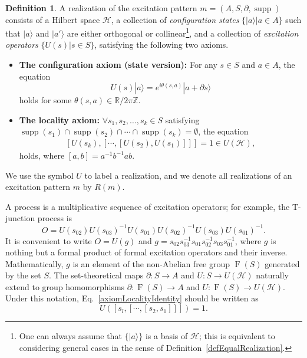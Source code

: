 \documentclass[reprint, amsmath, amssymb, showpacs, floatfix, longbibliography, aps, twocolumn, superscriptaddress, nofootinbib]{revtex4-2}
\newcommand{\ZZ}{{\mathbb Z}}
\newcommand{\RR}{{\mathbb R}}
\newcommand{\supp}{\operatorname{supp}}
\theoremstyle{definition}
\newtheorem{definition}{Definition}[section]
\begin{document}
\begin{definition}\label{defRealization}
	A realization of the excitation pattern \(m=(A,S,\partial,\supp)\) consists of a Hilbert space $\mathcal{H}$, a collection of \textit{configuration states} $\{|a\rangle|a\in A\}$ such that $|a\rangle$ and $|a'\rangle$ are either orthogonal or collinear\footnote{One can always assume that $\{|a\rangle\}$ is a basis of \(\mathcal{H}\); this is equivalent to considering general cases in the sense of Definition~\ref{defEqualRealization}.}, and a collection of \textit{excitation operators} $\{U(s)|s\in S\}$, satisfying the following two axioms.
	\begin{itemize}
			\item \textbf{The configuration axiom (state version):} For any $s\in S$ and $a\in A$, the equation
			\begin{equation}\label{eqChangeConfig}
				U(s)|a\rangle=e^{i\theta(s,a)}|a+\partial s\rangle
			\end{equation}
			holds for some $\theta(s,a)\in \RR/2\pi\ZZ$.
			\item \textbf{The locality axiom:} \(\forall s_1, s_2, \dots, s_k \in S\) satisfying \(\operatorname{supp}(s_1) \cap \operatorname{supp}(s_2) \cap \cdots \cap \operatorname{supp}(s_k) = \emptyset\), the equation
			\begin{align}\label{axiomLocalityIdentity}
				[ U(s_k), [\cdots, [ U(s_2),  U(s_1)]]]=1 \in U(\mathcal{H}),
			\end{align}
			holds, where \([a,b] = a^{-1}b^{-1}ab\).
	\end{itemize}
	We use the symbol $U$ to label a realization, and we denote all realizations of an excitation pattern $m$ by $R(m)$.
\end{definition}

A process is a multiplicative sequence of excitation operators; for example, the T-junction process is
\begin{equation}\label{eqO}
	O=U(s_{02})U(s_{03})^{-1}U(s_{01})U(s_{02})^{-1}U(s_{03})U(s_{01})^{-1}.
\end{equation}
 It is convenient to write $O=U(g)$ and $g=s_{02} s_{03}^{-1} s_{01} s_{02}^{-1} s_{03} s_{01}^{-1}$, where $g$ is nothing but a formal product of formal excitation operators and their inverse. Mathematically, $g$ is an element of the non-Abelian free group $\operatorname{F}(S)$ generated by the set $S$. The set-theoretical maps $\partial: S\rightarrow A$ and $U: S\rightarrow U(\mathcal{H})$ naturally extend to group homomorphisms $\partial: \operatorname{F}(S)\rightarrow A$ and $U: \operatorname{F}(S)\rightarrow U(\mathcal{H})$. Under this notation, Eq.~\eqref{axiomLocalityIdentity} should be written as
 \begin{equation}
 	U([s_l,[\cdots,[s_2,s_1]]])=1.
 \end{equation}
 
\end{document}
